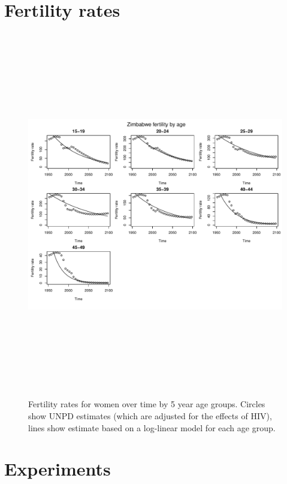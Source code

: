 \documentclass{article}
\begin{document}
\clearpage

\section*{Fertility rates}





\begin{figure}
\includegraphics[width=16cm,height=16cm]{EstimatingRatesFromUNPDv2-Fertility} 

\caption{Fertility rates for women  over time by 5 year age groups. Circles show UNPD estimates (which are adjusted for the effects of HIV), lines show estimate based on a log-linear model for each age group.}
\label{Fertility}
\end{figure}


\clearpage
\section*{Experiments}
\end{document}
